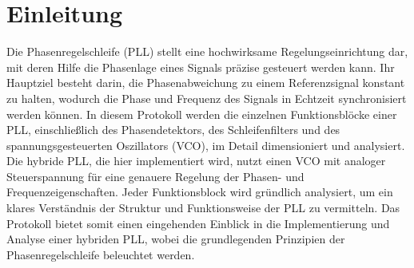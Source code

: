 \section{Einleitung}

Die Phasenregelschleife (PLL) stellt eine hochwirksame Regelungseinrichtung dar, mit deren Hilfe die Phasenlage eines Signals präzise gesteuert werden kann. Ihr Hauptziel besteht darin, die Phasenabweichung zu einem Referenzsignal konstant zu halten, wodurch die Phase und Frequenz des Signals in Echtzeit synchronisiert werden können. In diesem Protokoll werden die einzelnen Funktionsblöcke einer PLL, einschließlich des Phasendetektors, des Schleifenfilters und des spannungsgesteuerten Oszillators (VCO), im Detail dimensioniert und analysiert. Die hybride PLL, die hier implementiert wird, nutzt einen VCO mit analoger Steuerspannung für eine genauere Regelung der Phasen- und Frequenzeigenschaften. Jeder Funktionsblock wird gründlich analysiert, um ein klares Verständnis der Struktur und Funktionsweise der PLL zu vermitteln. Das Protokoll bietet somit einen eingehenden Einblick in die Implementierung und Analyse einer hybriden PLL, wobei die grundlegenden Prinzipien der Phasenregelschleife beleuchtet werden.